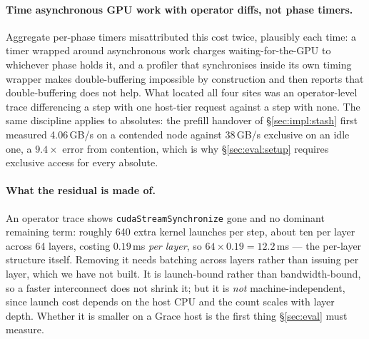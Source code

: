 \paragraph{Time asynchronous GPU work with operator diffs, not phase timers.}
Aggregate per-phase timers misattributed this cost twice, plausibly each time: a
timer wrapped around asynchronous work charges waiting-for-the-GPU to whichever
phase holds it, and a profiler that synchronises inside its own timing wrapper
makes double-buffering impossible by construction and then reports that
double-buffering does not help. What located all four sites was an
operator-level trace differencing a step with one host-tier request against a
step with none. The same discipline applies to absolutes: the prefill handover of \S\ref{sec:impl:stash}
first measured 4.06\,GB/s on a contended node against 38\,GB/s exclusive on an
idle one, a $9.4\times$ error from contention, which is why
\S\ref{sec:eval:setup} requires exclusive access for every absolute.

\paragraph{What the residual is made of.} An operator trace shows
\texttt{cudaStreamSynchronize} gone and no dominant remaining term: roughly 640
extra kernel launches per step, about ten per layer across 64 layers, costing
$0.19$\,ms \emph{per layer}, so $64 \times 0.19 = 12.2$\,ms --- the per-layer structure itself. Removing it needs batching
across layers rather than issuing per layer, which we have not built. It is
launch-bound rather than bandwidth-bound, so a faster interconnect does not
shrink it; but it is \emph{not} machine-independent, since launch cost depends on
the host CPU and the count scales with layer depth. Whether it is smaller on a
Grace host is the first thing \S\ref{sec:eval} must measure.
